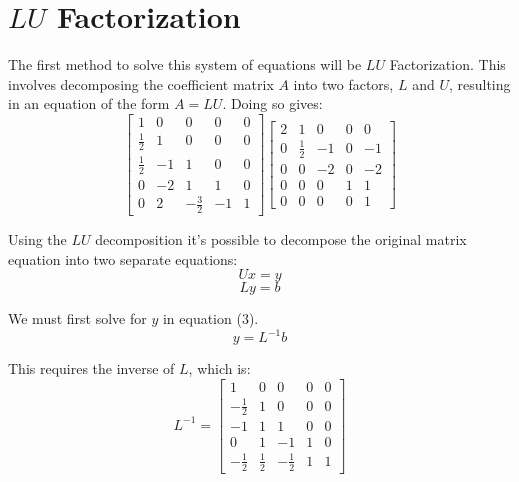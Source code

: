 \documentclass[paper.tex]{subfiles}
\begin{document}
\section{$LU$ Factorization}

The first method to solve this system of equations will be $LU$ Factorization.
This involves decomposing the coefficient matrix $A$ into two factors, $L$ and $U$, resulting in an equation of the form $A = LU$.
Doing so gives:
\begin{equation*}
    \begin{bmatrix}
        1 & 0 & 0 & 0 & 0 \\
        \frac{1}{2} & 1 & 0 & 0 & 0 \\
        \frac{1}{2} & -1 & 1 & 0 & 0 \\
        0 & -2 & 1 & 1 & 0 \\
        0 & 2 & -\frac{3}{2} & -1 & 1
    \end{bmatrix}
    \begin{bmatrix}
        2 & 1 & 0 & 0 & 0 \\
        0 & \frac{1}{2} & -1 & 0 & -1 \\
        0 & 0 & -2 & 0 & -2 \\
        0 & 0 & 0 & 1 & 1 \\
        0 & 0 & 0 & 0 & 1 
    \end{bmatrix}
\end{equation*}

Using the $LU$ decomposition it's possible to decompose the original matrix equation into two separate equations:
\begin{equation}
    Ux = y
\end{equation}
\begin{equation}
    Ly = b
\end{equation}

We must first solve for $y$ in equation (3). 
\begin{equation}
    y = L^{-1}b
\end{equation}

This requires the inverse of $L$, which is:
\begin{equation*}
    L^{-1}=\begin{bmatrix}
        1 & 0 & 0 & 0 & 0 \\
        -\frac{1}{2} & 1 & 0 & 0 & 0 \\
        -1 & 1 & 1 & 0 & 0 \\
        0 & 1 & -1 & 1 & 0 \\
        -\frac{1}{2} & \frac{1}{2} & -\frac{1}{2} & 1 & 1 
    \end{bmatrix}
\end{equation*}
\end{document}
